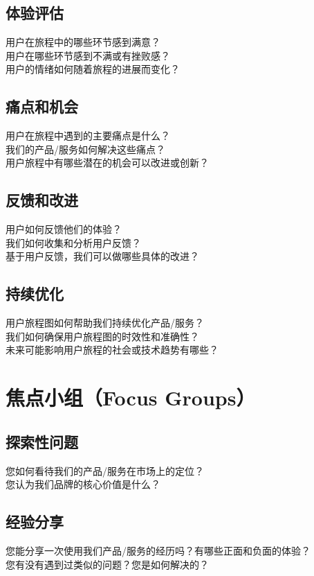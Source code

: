 \documentclass[12pt]{book}
\begin{document}
\subsection{体验评估}
用户在旅程中的哪些环节感到满意？\\
用户在哪些环节感到不满或有挫败感？\\
用户的情绪如何随着旅程的进展而变化？\\


\subsection{痛点和机会}
用户在旅程中遇到的主要痛点是什么？\\
我们的产品/服务如何解决这些痛点？\\
用户旅程中有哪些潜在的机会可以改进或创新？\\


\subsection{反馈和改进}
用户如何反馈他们的体验？\\
我们如何收集和分析用户反馈？\\
基于用户反馈，我们可以做哪些具体的改进？\\


\subsection{持续优化}
用户旅程图如何帮助我们持续优化产品/服务？\\
我们如何确保用户旅程图的时效性和准确性？\\
未来可能影响用户旅程的社会或技术趋势有哪些？\\


\section{焦点小组（Focus Groups）}
\subsection{探索性问题}
您如何看待我们的产品/服务在市场上的定位？\\
您认为我们品牌的核心价值是什么？\\

\subsection{经验分享}
您能分享一次使用我们产品/服务的经历吗？有哪些正面和负面的体验？\\
您有没有遇到过类似的问题？您是如何解决的？\\
\end{document}
